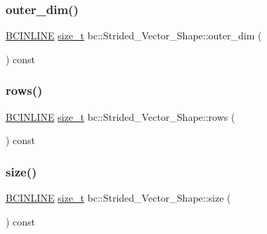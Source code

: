 \mbox{\label{structbc_1_1Strided__Vector__Shape_a19a29dadd17c10878238f95586e33395}} 
\subsubsection{\texorpdfstring{outer\+\_\+dim()}{outer\_dim()}}
{\footnotesize\ttfamily \hyperlink{common_8h_a6699e8b0449da5c0fafb878e59c1d4b1}{B\+C\+I\+N\+L\+I\+NE} \hyperlink{namespacebc_aaf8e3fbf99b04b1b57c4f80c6f55d3c5}{size\+\_\+t} bc\+::\+Strided\+\_\+\+Vector\+\_\+\+Shape\+::outer\+\_\+dim (\begin{DoxyParamCaption}{ }\end{DoxyParamCaption}) const\hspace{0.3cm}{\ttfamily [inline]}}

\mbox{\label{structbc_1_1Strided__Vector__Shape_a54bf2b0dd9e4355260f9983abd03031b}} 
\subsubsection{\texorpdfstring{rows()}{rows()}}
{\footnotesize\ttfamily \hyperlink{common_8h_a6699e8b0449da5c0fafb878e59c1d4b1}{B\+C\+I\+N\+L\+I\+NE} \hyperlink{namespacebc_aaf8e3fbf99b04b1b57c4f80c6f55d3c5}{size\+\_\+t} bc\+::\+Strided\+\_\+\+Vector\+\_\+\+Shape\+::rows (\begin{DoxyParamCaption}{ }\end{DoxyParamCaption}) const\hspace{0.3cm}{\ttfamily [inline]}}

\mbox{\label{structbc_1_1Strided__Vector__Shape_ac7287aab62a274724e01bc60e47d1136}} 
\subsubsection{\texorpdfstring{size()}{size()}}
{\footnotesize\ttfamily \hyperlink{common_8h_a6699e8b0449da5c0fafb878e59c1d4b1}{B\+C\+I\+N\+L\+I\+NE} \hyperlink{namespacebc_aaf8e3fbf99b04b1b57c4f80c6f55d3c5}{size\+\_\+t} bc\+::\+Strided\+\_\+\+Vector\+\_\+\+Shape\+::size (\begin{DoxyParamCaption}{ }\end{DoxyParamCaption}) const\hspace{0.3cm}{\ttfamily [inline]}}




